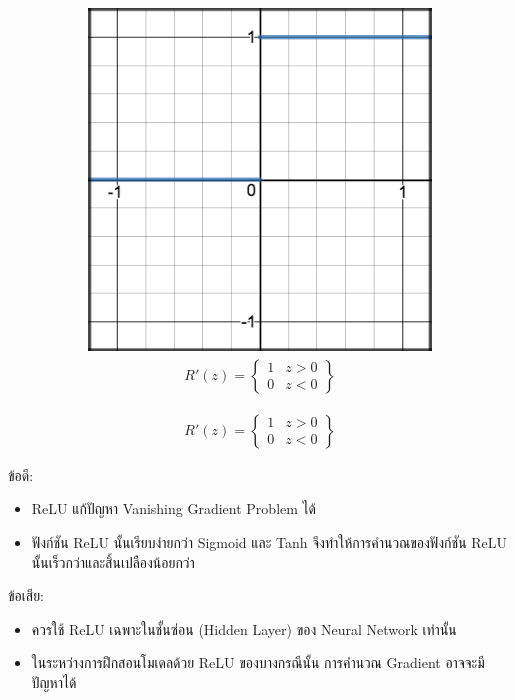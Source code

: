 \begin{itemize}
\begin{figure}[H]
\begin{subfigure}{0.5\textwidth}
            \includegraphics[width=0.9\linewidth]{fig/actfunc_relu_der.png}
            \caption{%
                \begin{equation}
                    \begin{split}R'(z) = \begin{Bmatrix} 1 & z>0 \\
                        0 & z<0 \end{Bmatrix}\end{split}
                \end{equation}
            }
            \label{fig:actfunc_relu_der}
        \end{subfigure}
    \end{figure}
    ข้อดี:
    \begin{itemize}
        \item ReLU แก้ปัญหา Vanishing Gradient Problem ได้
        \item ฟังก์ชัน ReLU นั้นเรียบง่ายกว่า Sigmoid และ Tanh จึงทำให้การคำนวณของฟังก์ชัน ReLU นั้นเร็วกว่าและสิ้นเปลืองน้อยกว่า 
    \end{itemize}
    ข้อเสีย:
    \begin{itemize}
        \item ควรใช้ ReLU เฉพาะในชั้นซ่อน (Hidden Layer) ของ Neural Network เท่านั้น
        
        \item ในระหว่างการฝึกสอนโมเดลด้วย ReLU ของบางกรณีนั้น การคำนวณ Gradient อาจจะมีปัญหาได้
        

\end{itemize}
\end{itemize}
